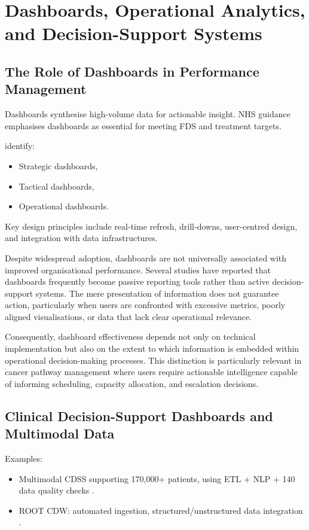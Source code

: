 \section{Dashboards, Operational Analytics, and Decision-Support Systems}

\subsection{The Role of Dashboards in Performance Management}

Dashboards synthesise high-volume data for actionable insight. NHS guidance emphasises dashboards as essential for meeting FDS and treatment targets.

\cite{buttigieg2017} identify:

\begin{itemize}
    \item Strategic dashboards,
    \item Tactical dashboards,
    \item Operational dashboards.
\end{itemize}

Key design principles include real‑time refresh, drill‑downs, user-centred design, and integration with data infrastructures.

Despite widespread adoption, dashboards are not universally associated with improved organisational performance. Several studies have reported that dashboards frequently become passive reporting tools rather than active decision-support systems. The mere presentation of information does not guarantee action, particularly when users are confronted with excessive metrics, poorly aligned visualisations, or data that lack clear operational relevance.

Consequently, dashboard effectiveness depends not only on technical implementation but also on the extent to which information is embedded within operational decision-making processes. This distinction is particularly relevant in cancer pathway management where users require actionable intelligence capable of informing scheduling, capacity allocation, and escalation decisions.

\subsection{Clinical Decision-Support Dashboards and Multimodal Data}

Examples:

\begin{itemize}
    \item Multimodal CDSS supporting 170,000+ patients, using ETL + NLP + 140 data quality checks \citep{chang2025}.
    \item ROOT CDW: automated ingestion, structured/unstructured data integration \citep{jung2021}.
\end{itemize}

